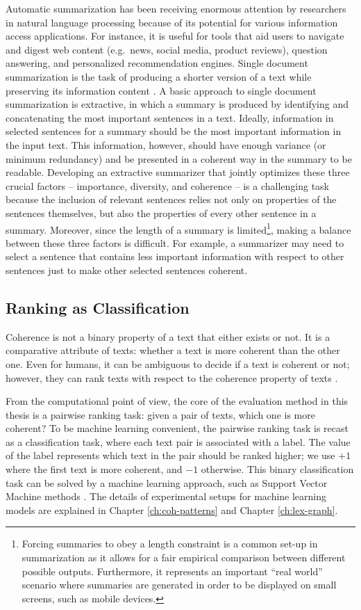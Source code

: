 Automatic summarization has been receiving enormous attention by researchers in natural language processing because of its potential for various information access applications. 
For instance, it is useful for tools that aid users to navigate and digest web content (e.g.\ news, social media, product reviews), question answering, and personalized recommendation engines. 
Single document summarization is the task of producing a shorter version of a text while preserving its information content \cite{nenkova11}. 
A basic approach to single document summarization is extractive, in which a summary is produced by identifying and concatenating the most important sentences in a text. 
Ideally, information in selected sentences for a summary should be the most important information in the input text. 
This information, however, should have enough variance (or minimum redundancy) and be presented in a coherent way in the summary to be readable. 
Developing an extractive summarizer that jointly optimizes these three crucial factors -- importance, diversity, and coherence -- is a challenging task because the inclusion of relevant sentences relies not only on properties of the sentences themselves, but also the properties of every other sentence in a summary. 
Moreover, since the length of a summary is limited\footnote{Forcing summaries to obey a length constraint is a common set-up in summarization as it allows for a fair empirical comparison between different possible outputs. 
 Furthermore, it represents an important ``real world'' scenario where summaries are generated in order to be displayed on small screens, such as mobile devices.
}, making a balance between these three factors is difficult. 
For example, a summarizer may need to select a sentence that contains less important information with respect to other sentences just to make other selected sentences coherent. 

\subsection{Ranking as Classification} 

Coherence is not a binary property of a text that either exists or not. 
It is a comparative attribute of texts: whether a text is more coherent than the other one. 
Even for humans, it can be ambiguous to decide if a text is coherent or not; however, they can rank texts with respect to the coherence property of texts \cite{halliday76}.   

From the computational point of view, the core of the evaluation method in this thesis is a pairwise ranking task: given a pair of texts, which one is more coherent? 
To be machine learning convenient, the pairwise ranking task is recast as a classification task, where each text pair is associated with a label. 
The value of the label represents which text in the pair should be ranked higher; we use $+1$ where the first text is more coherent, and $-1$ otherwise. 
This binary classification task can be solved by a machine learning approach, such as Support Vector Machine methods \cite{bishop06}.  
The details of experimental setups for machine learning models are explained in Chapter \ref{ch:coh-patterns} and Chapter \ref{ch:lex-graph}.  

